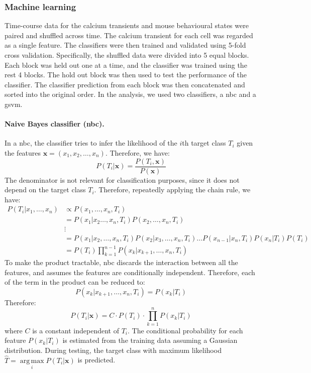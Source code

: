 \subsubsection{Machine learning}

Time-course data for the calcium transients and mouse behavioural states were paired and shuffled across time. The calcium transient for each cell was regarded as a single feature. The classifiers were then trained and validated using 5-fold cross validation. Specifically, the shuffled data were divided into 5 equal blocks. Each block was held out one at a time, and the classifier was trained using the rest 4 blocks. The hold out block was then used to test the performance of the classifier. The classifier prediction from each block was then concatenated and sorted into the original order. In the analysis, we used two classifiers, a \gls{nbc} and a \gls{gsvm}. 

\paragraph{Naive Bayes classifier (\gls{nbc}).}
In a \gls{nbc}, the classifier tries to infer the likelihood of the $i$th target class $T_i$ given the features $\mathbf{x} = (x_1, x_2, \dots, x_n)$. Therefore, we have:
\begin{equation*}
    P(T_i|\mathbf{x}) = \frac{P(T_i, \mathbf{x})}{P(\mathbf{x})}
\end{equation*}
The denominator is not relevant for classification purposes, since it does not depend on the target class $T_i$. Therefore, repeatedly applying the chain rule, we have:
\begin{align*}
    P(T_i|x_1, \dots, x_n) &\propto P(x_1, \dots, x_n, T_i) \\
                           &= P(x_1|x_2 \dots, x_n, T_i) P(x_2, \dots, x_n, T_i) \\
                           &\vdots \\
                           &= P(x_1|x_2, \dots, x_n, T_i)  P(x_2|x_3, \dots, x_n, T_i) \ldots  P(x_{n-1}|x_n, T_i)  P(x_n|T_i)  P(T_i) \\
                           &= P(T_i)  \prod_{k=1}^{n-1} P(x_k|x_{k+1}, \dots, x_n, T_i)
\end{align*}
To make the product tractable, \gls{nbc} discards the interaction between all the features, and assumes the features are conditionally independent. Therefore, each of the term in the product can be reduced to:
\begin{equation*}
    P(x_k|x_{k+1}, \dots, x_n, T_i) = P(x_k|T_i)
\end{equation*}
Therefore:
\begin{equation*}
    P(T_i|\mathbf{x}) = C\cdot P(T_i) \cdot \prod_{k=1}^n P(x_k|T_i)
\end{equation*}
where $C$ is a constant independent of $T_i$. The conditional probability for each feature $P(x_k|T_i)$ is estimated from the training data assuming a Gaussian distribution. During testing, the target class with maximum likelihood $\hat{T}=\underset{i}{\operatorname{arg\,max}} P(T_i|\mathbf{x})$ is predicted.

